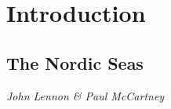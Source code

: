 \chapter{Introduction}

\section{The Nordic Seas}

\textit{John Lennon \& Paul McCartney}

\vspace{1cm}

\lipsum[1] \citep{stull1988introduction}

\vspace{3cm}

